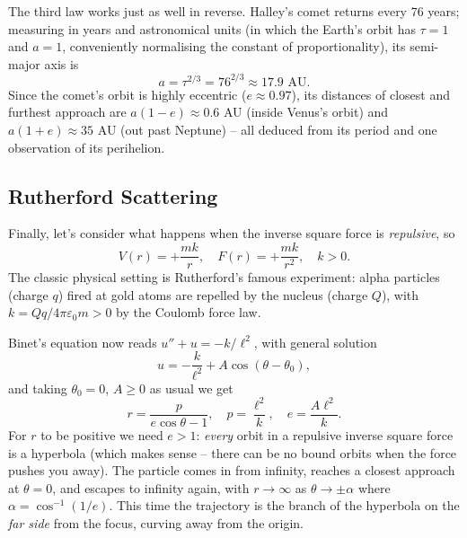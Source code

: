 \documentclass[a4paper]{scrartcl}
\begin{document}
\begin{example}
	The third law works just as well in reverse. Halley's comet returns every $76$ years; measuring in years and astronomical units (in which the Earth's orbit has $\tau = 1$ and $a = 1$, conveniently normalising the constant of proportionality), its semi-major axis is
	$$
	a = \tau^{2/3} = 76^{2/3} \approx 17.9 \text{ AU}.
	$$
	Since the comet's orbit is highly eccentric ($e \approx 0.97$), its distances of closest and furthest approach are $a(1 - e) \approx 0.6$ AU (inside Venus's orbit) and $a(1 + e) \approx 35$ AU (out past Neptune) -- all deduced from its period and one observation of its perihelion.
\end{example}

\subsection{Rutherford Scattering}

Finally, let's consider what happens when the inverse square force is \emph{repulsive}, so
$$
V(r) = +\frac{mk}{r}, \quad F(r) = +\frac{mk}{r^2}, \quad k > 0.
$$
The classic physical setting is Rutherford's famous experiment: alpha particles (charge $q$) fired at gold atoms are repelled by the nucleus (charge $Q$), with $k = Qq/4\pi\varepsilon_0 m > 0$ by the Coulomb force law.

Binet's equation now reads $u'' + u = -k/\ell^2$, with general solution
$$
u = -\frac{k}{\ell^2} + A \cos(\theta - \theta_0),
$$
and taking $\theta_0 = 0$, $A \geq 0$ as usual we get
$$
r = \frac{p}{e \cos \theta - 1}, \quad p = \frac{\ell^2}{k}, \quad e = \frac{A\ell^2}{k}.
$$
For $r$ to be positive we need $e > 1$: \emph{every} orbit in a repulsive inverse square force is a hyperbola (which makes sense -- there can be no bound orbits when the force pushes you away). The particle comes in from infinity, reaches a closest approach at $\theta = 0$, and escapes to infinity again, with $r \to \infty$ as $\theta \to \pm \alpha$ where $\alpha = \cos^{-1}(1/e)$. This time the trajectory is the branch of the hyperbola on the \emph{far side} from the focus, curving away from the origin.

\begin{center}
\end{center}
\end{document}
